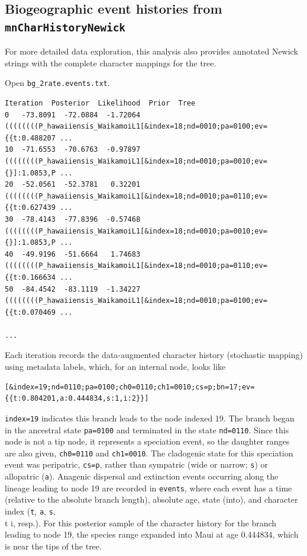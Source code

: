 \documentclass[11pt]{article}
\begin{document}
\subsection{Biogeographic event histories from {\tt mnCharHistoryNewick}}

For more detailed data exploration, this analysis also provides annotated Newick strings with the complete character mappings for the tree.

Open {\tt bg\_2rate.events.txt}.

\begin{framed}
\begin{lstlisting}[basicstyle=\tiny \listingsfont, columns=texcl]
Iteration  Posterior  Likelihood  Prior  Tree
0   -73.8091  -72.0884  -1.72064  ((((((((P_hawaiiensis_WaikamoiL1[&index=18;nd=0010;pa=0100;ev={{t:0.488207 ...
10  -71.6553  -70.6763  -0.97897  ((((((((P_hawaiiensis_WaikamoiL1[&index=18;nd=0010;pa=0010;ev={}]:1.0853,P ...
20  -52.0561  -52.3781   0.32201  ((((((((P_hawaiiensis_WaikamoiL1[&index=18;nd=0010;pa=0110;ev={{t:0.627439 ...
30  -78.4143  -77.8396  -0.57468  ((((((((P_hawaiiensis_WaikamoiL1[&index=18;nd=0010;pa=0010;ev={}]:1.0853,P ...
40  -49.9196  -51.6664   1.74683  ((((((((P_hawaiiensis_WaikamoiL1[&index=18;nd=0010;pa=0110;ev={{t:0.166634 ...
50  -84.4542  -83.1119  -1.34227  ((((((((P_hawaiiensis_WaikamoiL1[&index=18;nd=0010;pa=0100;ev={{t:0.070469 ...

...
\end{lstlisting}
\end{framed}

Each iteration records the data-augmented character history (stochastic mapping) using metadata labels, which, for an internal node, looks like

\begin{snugshade}
\begin{lstlisting}
[&index=19;nd=0110;pa=0100;ch0=0110;ch1=0010;cs=p;bn=17;ev={{t:0.804201,a:0.444834,s:1,i:2}}]
\end{lstlisting}
\end{snugshade}

{\tt index=19} indicates this branch leads to the node indexed 19.
The branch began in the ancestral state {\tt pa=0100} and terminated in the state {\tt nd=0110}.
Since this node is not a tip node, it represents a speciation event, so the daughter ranges are also given, {\tt ch0=0110} and {\tt ch1=0010}.
The cladogenic state for this speciation event was peripatric, {\tt cs=p}, rather than sympatric (wide or narrow; {\tt s}) or allopatric ({\tt a}).
Anagenic dispersal and extinction events occurring along the lineage leading to node 19 are recorded in {\tt events}, where each event has a time (relative to the absolute branch length), absolute age, state (into), and character index ({\tt t}, {\tt a}, {\tt s}, {\\t i}, resp.).
For this posterior sample of the character history for the branch leading to node 19, the species range expanded into Maui at age 0.444834, which is near the tips of the tree.
\end{document}
